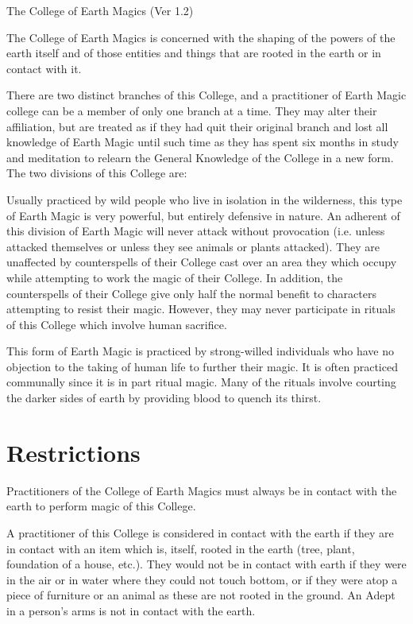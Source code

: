 \begin{Chapter}{The College of Earth Magics (Ver 1.2)}

The College of Earth Magics is concerned with the shaping of the
powers of the earth itself and of those entities and things that are
rooted in the earth or in contact with it.

There are two distinct branches of this College, and a practitioner of
Earth Magic college can be a member of only one branch at a time.
They may alter their affiliation, but are treated as if they had quit
their original branch and lost all knowledge of Earth Magic until such
time as they has spent six months in study and meditation to relearn
the General Knowledge of the College in a new form. The two divisions
of this College are:
\begin{Description}
\item[Pacifistic Earth Magic] Usually practiced by wild people who
  live in isolation in the wilderness, this type of Earth Magic is
  very powerful, but entirely defensive in nature. An adherent of this
  division of Earth Magic will never attack without provocation (i.e.
  unless attacked themselves or unless they see animals or plants
  attacked). They are unaffected by counterspells of their College
  cast over an area they which occupy while attempting to work the
  magic of their College.  In addition, the counterspells of their
  College give only half the normal benefit to characters attempting
  to resist their magic.  However, they may never participate in
  rituals of this College which involve human sacrifice.

\item[Druidic Earth Magic] This form of Earth Magic is practiced by
  strong-willed individuals who have no objection to the taking of
  human life to further their magic.  It is often practiced communally
  since it is in part ritual magic.  Many of the rituals involve
  courting the darker sides of earth by providing blood to quench its
  thirst.
\end{Description}


\section{Restrictions}

Practitioners of the College of Earth Magics must always be in contact
with the earth to perform magic of this College.

A practitioner of this College is considered in contact with the earth
if they are in contact with an item which is, itself, rooted in the
earth (tree, plant, foundation of a house, etc.). They would not be in
contact with earth if they were in the air or in water where they
could not touch bottom, or if they were atop a piece of furniture or
an animal as these are not rooted in the ground.  An Adept in a
person’s arms is not in contact with the earth.


\end{Chapter}
